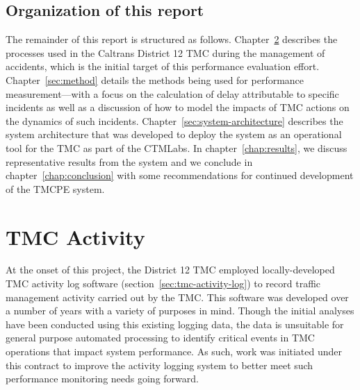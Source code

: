 \documentclass[12pt]{report}
\begin{document}
\section{Organization of this report}
\label{sec:organization}


The remainder of this report is structured as follows.
Chapter~\ref{chap:tmc-activity} describes the processes used in the Caltrans
District 12 \ac{TMC} during the management of accidents, which is the initial
target of this performance evaluation effort.  Chapter~\ref{sec:method} details
the methods being used for performance measurement---with a focus on the
calculation of delay attributable to specific incidents as well as a discussion
of how to model the impacts of \ac{TMC} actions on the dynamics of such
incidents.
Chapter~\ref{sec:system-architecture} describes the system architecture that was
developed to deploy the system as an operational tool for the \ac{TMC} as part
of the \ac{CTMLabs}.  In chapter~\ref{chap:results}, we discuss representative
results from the system and we conclude in chapter~\ref{chap:conclusion} with
some recommendations for continued development of the \ac{TMCPE} system.

\chapter{TMC Activity}
\label{chap:tmc-activity}

At the onset of this project, the District 12 \ac{TMC} employed
locally-developed \ac{TMC} activity log software
(section~\ref{sec:tmc-activity-log}) to record traffic management
activity carried out by the \ac{TMC}.  This software was developed
over a number of years with a variety of purposes in mind.  Though the
initial analyses have been conducted using this existing logging data,
the data is unsuitable for general purpose automated processing to
identify critical events in \ac{TMC} operations that impact system
performance.  As such, work was initiated under this contract to
improve the activity logging system to better meet such performance
monitoring needs going forward.
\end{document}

